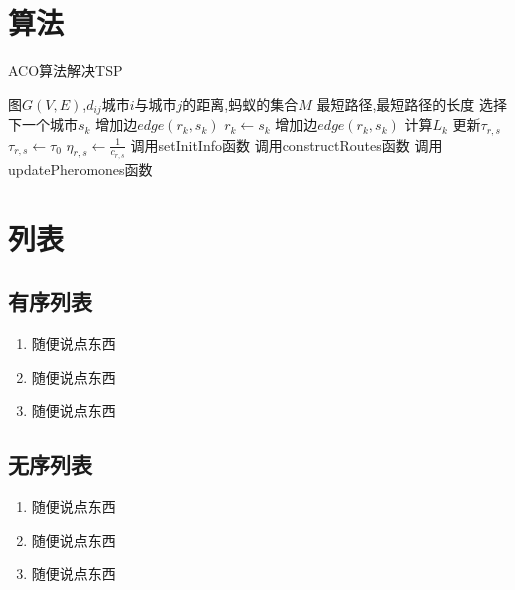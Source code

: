 \documentclass[bachelor,nocolorlinks, printoneside]{seuthesis} %
\begin{document}
\begin{Main}
\chapter{算法}
\begin{algorithm}
    \caption{ACO算法解决TSP}
    \begin{algorithmic}[1] %
        \Require 图$G(V,E)$,$d_{ij}$城市$i$与城市$j$的距离,蚂蚁的集合$M$
        \Ensure 最短路径,最短路径的长度
                    \State 选择下一个城市$s_k$
                    \State 增加边$edge(r_k,s_k)$
                    \State $r_k \leftarrow s_k$
                \EndFor
            \EndFor
                \State 增加边$edge(r_k,s_k)$
            \EndFor
        \EndFunction
                \State 计算$L_k$
                \State 更新$\tau_{r,s}$
            \EndFor
        \EndFunction
                \State $\tau_{r,s} \leftarrow \tau_0$
                \State $\eta_{r,s} \leftarrow \frac{1}{c_{r,s}}$
            \EndFor
                \State 调用setInitInfo函数
                \State 调用constructRoutes函数
                \State 调用updatePheromones函数
            \EndWhile
        \EndFunction
    \end{algorithmic}
\end{algorithm}

\chapter{列表}
\section{有序列表}
\begin{enumerate}[(1)]
    \item 随便说点东西
    \item 随便说点东西
    \item 随便说点东西
\end{enumerate}

\section{无序列表}
\begin{enumerate}[$\cdot$]
    \item 随便说点东西
    \item 随便说点东西
    \item 随便说点东西
\end{enumerate}


\end{Main}
\end{document}
